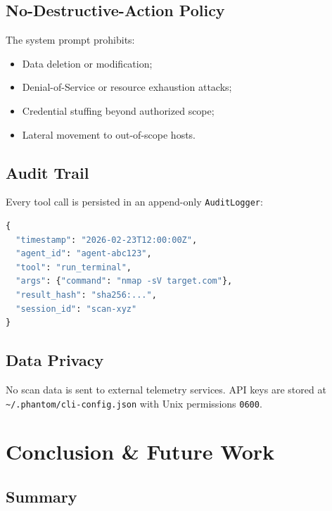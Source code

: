 \documentclass[12pt,a4paper]{article}
\begin{document}
\subsection{No-Destructive-Action Policy}

The system prompt prohibits:

\begin{itemize}
  \item Data deletion or modification;
  \item Denial-of-Service or resource exhaustion attacks;
  \item Credential stuffing beyond authorized scope;
  \item Lateral movement to out-of-scope hosts.
\end{itemize}

\subsection{Audit Trail}

Every tool call is persisted in an append-only \texttt{AuditLogger}:

\begin{lstlisting}[language=Python, caption={Audit log entry structure}]
{
  "timestamp": "2026-02-23T12:00:00Z",
  "agent_id": "agent-abc123",
  "tool": "run_terminal",
  "args": {"command": "nmap -sV target.com"},
  "result_hash": "sha256:...",
  "session_id": "scan-xyz"
}
\end{lstlisting}

\subsection{Data Privacy}

No scan data is sent to external telemetry services. API keys are stored at \texttt{\textasciitilde/.phantom/cli-config.json} with Unix permissions \texttt{0600}.



\section{Conclusion \& Future Work}

\subsection{Summary}
\end{document}
